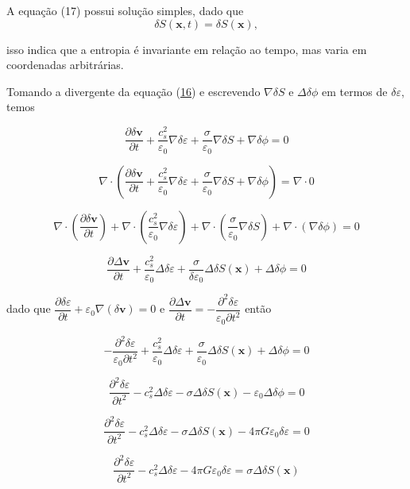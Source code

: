 \documentclass[a4paper,12pt]{article}
\begin{document}
A equação (17) possui solução simples, dado que
\begin{equation}\label{eq19}
	\delta S (\textbf{x},t) =\delta S (\textbf{x}),
\end{equation}

isso indica que a entropia é invariante em relação ao tempo, mas varia em coordenadas arbitrárias.

Tomando a divergente da equação (\hyperref[eq16]{16}) e escrevendo $\nabla\delta S$ e $\Delta\delta\phi$ em termos de $\delta\varepsilon$, temos

$$\dfrac{\partial\delta\textbf{v}}{\partial t} + \dfrac{c^2_s}{\varepsilon_0} \nabla\delta\varepsilon + \dfrac{\sigma}{\varepsilon_0}\nabla\delta S + \nabla\delta\phi = 0$$

$$\nabla\cdot \left( \dfrac{\partial\delta\textbf{v}}{\partial t} + \dfrac{c^2_s}{\varepsilon_0} \nabla\delta\varepsilon + \dfrac{\sigma}{\varepsilon_0}\nabla\delta S + \nabla\delta\phi \right)= \nabla\cdot 0$$

$$\nabla\cdot \left( \dfrac{\partial\delta\textbf{v}}{\partial t} \right) + \nabla\cdot \left( \dfrac{c^2_s}{\varepsilon_0} \nabla\delta\varepsilon \right) +\nabla\cdot \left( \dfrac{\sigma}{\varepsilon_0}\nabla\delta S \right) + \nabla\cdot \left( \nabla\delta\phi \right) = 0$$

$$\dfrac{\partial\Delta\textbf{v}}{\partial t} + \dfrac{c^2_s}{\varepsilon_0} \Delta\delta\varepsilon  + \dfrac{\sigma}{\delta\varepsilon_0}\Delta\delta S (\textbf{x})+  \Delta\delta\phi = 0$$

dado que $\dfrac{\partial\delta\varepsilon}{\partial t} + \varepsilon_0 \nabla (\delta\textbf{v}) = 0$ e $\dfrac{\partial\Delta\textbf{v}}{\partial t}= - \dfrac{\partial^2\delta\varepsilon}{\varepsilon_0\partial t^2} $ então

$$- \dfrac{\partial^2\delta\varepsilon}{\varepsilon_0\partial t^2}+\dfrac{c^2_s}{\varepsilon_0} \Delta\delta\varepsilon  + \dfrac{\sigma}{\varepsilon_0}\Delta\delta S (\textbf{x})+  \Delta\delta\phi = 0$$

$$\dfrac{\partial^2\delta\varepsilon}{\partial t^2}-c^2_s \Delta\delta\varepsilon  -\sigma\Delta\delta S (\textbf{x})-  \varepsilon_0\Delta\delta\phi = 0$$

$$\dfrac{\partial^2\delta\varepsilon}{\partial t^2}-c^2_s \Delta\delta\varepsilon  -\sigma\Delta\delta S (\textbf{x})-  4\pi G\varepsilon_0\delta\varepsilon = 0$$

\begin{equation}\label{eq20}
	\dfrac{\partial^2\delta\varepsilon}{\partial t^2} - c^2_s\Delta\delta\varepsilon - 4\pi G\varepsilon_0\delta\varepsilon = \sigma\Delta\delta S(\textbf{x})
\end{equation}
\end{document}
